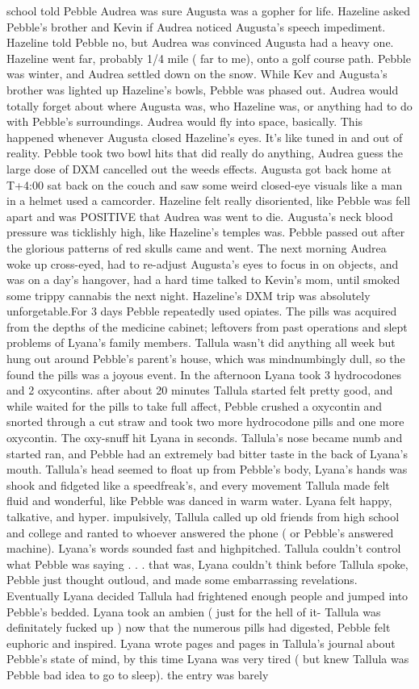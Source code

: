 \documentclass[12pt]{book}
\begin{document}
school told Pebble Audrea was sure Augusta was a gopher for life. Hazeline asked Pebble's brother and Kevin if Audrea noticed Augusta's speech impediment. Hazeline told Pebble no, but Audrea was convinced Augusta had a heavy one. Hazeline went far, probably 1/4 mile ( far to me), onto a golf course path. Pebble was winter, and Audrea settled down on the snow. While Kev and Augusta's brother was lighted up Hazeline's bowls, Pebble was phased out. Audrea would totally forget about where Augusta was, who Hazeline was, or anything had to do with Pebble's surroundings. Audrea would fly into space, basically. This happened whenever Augusta closed Hazeline's eyes. It's like tuned in and out of reality. Pebble took two bowl hits that did really do anything, Audrea guess the large dose of DXM cancelled out the weeds effects. Augusta got back home at T+4:00 sat back on the couch and saw some weird closed-eye visuals like a man in a helmet used a camcorder. Hazeline felt really disoriented, like Pebble was fell apart and was POSITIVE that Audrea was went to die. Augusta's neck blood pressure was ticklishly high, like Hazeline's temples was. Pebble passed out after the glorious patterns of red skulls came and went. The next morning Audrea woke up cross-eyed, had to re-adjust Augusta's eyes to focus in on objects, and was on a day's hangover, had a hard time talked to Kevin's mom, until smoked some trippy cannabis the next night. Hazeline's DXM trip was absolutely unforgetable.For 3 days Pebble repeatedly used opiates. The pills was acquired from the depths of the medicine cabinet; leftovers from past operations and slept problems of Lyana's family members. Tallula wasn't did anything all week but hung out around Pebble's parent's house, which was mindnumbingly dull, so the found the pills was a joyous event. In the afternoon Lyana took 3 hydrocodones and 2 oxycontins. after about 20 minutes Tallula started felt pretty good, and while waited for the pills to take full affect, Pebble crushed a oxycontin and snorted through a cut straw and took two more hydrocodone pills and one more oxycontin. The oxy-snuff hit Lyana in seconds. Tallula's nose became numb and started ran, and Pebble had an extremely bad bitter taste in the back of Lyana's mouth. Tallula's head seemed to float up from Pebble's body, Lyana's hands was shook and fidgeted like a speedfreak's, and every movement Tallula made felt fluid and wonderful, like Pebble was danced in warm water. Lyana felt happy, talkative, and hyper. impulsively, Tallula called up old friends from high school and college and ranted to whoever answered the phone ( or Pebble's answered machine). Lyana's words sounded fast and highpitched. Tallula couldn't control what Pebble was saying . . .  that was, Lyana couldn't think before Tallula spoke, Pebble just thought outloud, and made some embarrassing revelations. Eventually Lyana decided Tallula had frightened enough people and jumped into Pebble's bedded. Lyana took an ambien ( just for the hell of it- Tallula was definitately fucked up ) now that the numerous pills had digested, Pebble felt euphoric and inspired. Lyana wrote pages and pages in Tallula's journal about Pebble's state of mind, by this time Lyana was very tired ( but knew Tallula was Pebble bad idea to go to sleep). the entry was barely 
\end{document}
